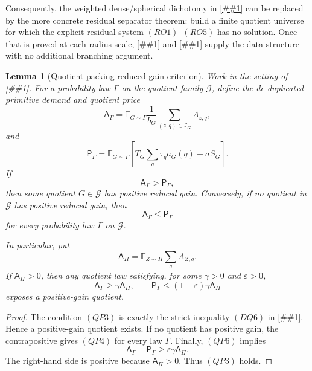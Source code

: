 \documentclass[10pt]{article}
\newcommand{\cref}[1]{\ref{##1}}
\newtheorem{lemma}[theorem]{Lemma}
\theoremstyle{definition}
\newcommand{\E}{\mathbb{E}}
\begin{document}
Consequently, the weighted dense/spherical dichotomy in
\cref{asm:weighted-dense-spherical-dichotomy} can be replaced by the more
concrete residual separator theorem: build a finite quotient universe for which
the explicit residual system \((RO1)\)--\((RO5)\) has no solution.  Once that is
proved at each radius scale, \cref{lem:finite-signature-filter-cover} and
\cref{prop:fractional-filter-cover-polylog} supply the data structure with no
additional branching argument.

\begin{lemma}[Quotient-packing reduced-gain criterion]
   \label{lem:quotient-packing-reduced-gain}
   Work in the setting of \cref{lem:dense-slice-quotient-separation}.  For a
   probability law \(\Gamma\) on the quotient family \(\mathcal G\), define the
   de-duplicated primitive demand and quotient price
   \[
      \mathsf A_\Gamma
      =
      \E_{G\sim\Gamma}
      \frac1{b_G}\sum_{(z,q)\in\mathcal I_G}A_{z,q},
      \tag{QP1}
   \]
   and
   \[
      \mathsf P_\Gamma
      =
      \E_{G\sim\Gamma}
      \left[
         T_G\sum_q\tau_qa_G(q)+\sigma S_G
      \right].
      \tag{QP2}
   \]
   If
   \[
      \mathsf A_\Gamma>\mathsf P_\Gamma,
      \tag{QP3}
   \]
   then some quotient \(G\in\mathcal G\) has positive reduced gain.  Conversely,
   if no quotient in \(\mathcal G\) has positive reduced gain, then
   \[
      \mathsf A_\Gamma\le \mathsf P_\Gamma
      \tag{QP4}
   \]
   for every probability law \(\Gamma\) on \(\mathcal G\).

   In particular, put
   \[
      \mathsf A_\Pi=\E_{Z\sim\Pi}\sum_qA_{Z,q}.
      \tag{QP5}
   \]
   If \(\mathsf A_\Pi>0\), then any quotient law satisfying, for some
   \(\gamma>0\) and \(\varepsilon>0\),
   \[
      \mathsf A_\Gamma\ge \gamma\mathsf A_\Pi,
      \qquad
      \mathsf P_\Gamma\le (1-\varepsilon)\gamma\mathsf A_\Pi
      \tag{QP6}
   \]
   exposes a positive-gain quotient.
\end{lemma}

\begin{proof}
   The condition \((QP3)\) is exactly the strict inequality \((DQ6)\) in
   \cref{lem:dense-slice-quotient-separation}.  Hence a positive-gain quotient
   exists.  If no quotient has positive gain, the contrapositive gives
   \((QP4)\) for every law \(\Gamma\).  Finally, \((QP6)\) implies
   \[
      \mathsf A_\Gamma-\mathsf P_\Gamma
      \ge
      \varepsilon\gamma\mathsf A_\Pi.
   \]
   The right-hand side is positive because \(\mathsf A_\Pi>0\).  Thus
   \((QP3)\) holds.
\end{proof}
\end{document}
